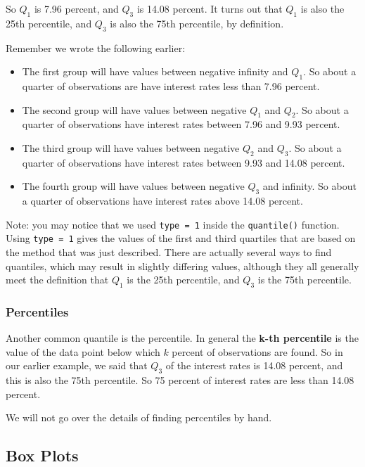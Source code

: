 \documentclass[
]{book}
\providecommand{\tightlist}{%
  \setlength{\itemsep}{0pt}\setlength{\parskip}{0pt}}
\begin{document}
So \(Q_1\) is 7.96 percent, and \(Q_3\) is 14.08 percent. It turns out that \(Q_1\) is also the 25th percentile, and \(Q_3\) is also the 75th percentile, by definition.

Remember we wrote the following earlier:

\begin{itemize}
\tightlist
\item
  The first group will have values between negative infinity and \(Q_1\). So about a quarter of observations are have interest rates less than 7.96 percent.
\item
  The second group will have values between negative \(Q_1\) and \(Q_2\). So about a quarter of observations have interest rates between 7.96 and 9.93 percent.
\item
  The third group will have values between negative \(Q_2\) and \(Q_3\). So about a quarter of observations have interest rates between 9.93 and 14.08 percent.
\item
  The fourth group will have values between negative \(Q_3\) and infinity. So about a quarter of observations have interest rates above 14.08 percent.
\end{itemize}

Note: you may notice that we used \texttt{type\ =\ 1} inside the \texttt{quantile()} function. Using \texttt{type\ =\ 1} gives the values of the first and third quartiles that are based on the method that was just described. There are actually several ways to find quantiles, which may result in slightly differing values, although they all generally meet the definition that \(Q_1\) is the 25th percentile, and \(Q_3\) is the 75th percentile.

\subsubsection{Percentiles}\label{percentiles}

Another common quantile is the percentile. In general the \textbf{k-th percentile} is the value of the data point below which \(k\) percent of observations are found. So in our earlier example, we said that \(Q_3\) of the interest rates is 14.08 percent, and this is also the 75th percentile. So 75 percent of interest rates are less than 14.08 percent.

We will not go over the details of finding percentiles by hand.

\subsection{Box Plots}\label{box-plots}
\end{document}
